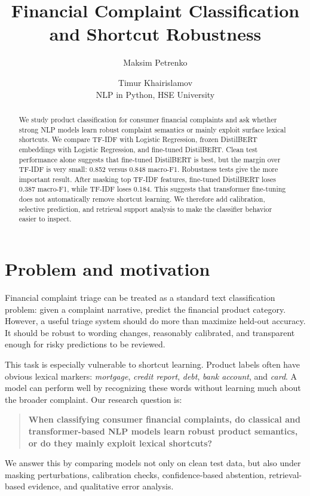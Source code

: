 \documentclass[11pt,twocolumn]{article}
\title{\textbf{Financial Complaint Classification and Shortcut Robustness}}
\author{Maksim Petrenko \and Timur Khairislamov\\
NLP in Python, HSE University}
\date{}
\begin{document}
\maketitle

\begin{abstract}
We study product classification for consumer financial complaints and ask whether strong NLP models learn robust complaint semantics or mainly exploit surface lexical shortcuts. We compare TF-IDF with Logistic Regression, frozen DistilBERT embeddings with Logistic Regression, and fine-tuned DistilBERT. Clean test performance alone suggests that fine-tuned DistilBERT is best, but the margin over TF-IDF is very small: 0.852 versus 0.848 macro-F1. Robustness tests give the more important result. After masking top TF-IDF features, fine-tuned DistilBERT loses 0.387 macro-F1, while TF-IDF loses 0.184. This suggests that transformer fine-tuning does not automatically remove shortcut learning. We therefore add calibration, selective prediction, and retrieval support analysis to make the classifier behavior easier to inspect.
\end{abstract}

\section{Problem and motivation}
Financial complaint triage can be treated as a standard text classification problem: given a complaint narrative, predict the financial product category. However, a useful triage system should do more than maximize held-out accuracy. It should be robust to wording changes, reasonably calibrated, and transparent enough for risky predictions to be reviewed.

This task is especially vulnerable to shortcut learning. Product labels often have obvious lexical markers: \textit{mortgage}, \textit{credit report}, \textit{debt}, \textit{bank account}, and \textit{card}. A model can perform well by recognizing these words without learning much about the broader complaint. Our research question is:

\begin{quote}\small
\textbf{When classifying consumer financial complaints, do classical and transformer-based NLP models learn robust product semantics, or do they mainly exploit lexical shortcuts?}
\end{quote}

We answer this by comparing models not only on clean test data, but also under masking perturbations, calibration checks, confidence-based abstention, retrieval-based evidence, and qualitative error analysis.
\end{document}
